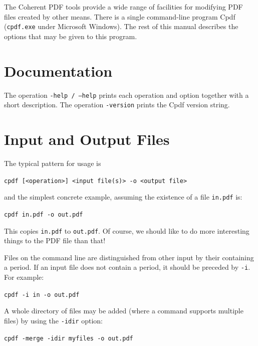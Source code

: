 \documentclass{book}
\begin{document}
  The Coherent PDF tools provide a wide range of facilities for modifying PDF
files created by other means. There is a single command-line program
Cpdf (\texttt{cpdf.exe} under Microsoft Windows). The rest of this manual describes the options that may be given
to this program.

\section{Documentation}

The operation \texttt{-help / --help} prints each operation and option together with a short description. The operation \texttt{-version} prints the Cpdf version string.

   
  \section{Input and Output Files}
  The typical pattern for usage is

  \begin{framed}
  \noindent\small\verb!cpdf [<operation>] <input file(s)> -o <output file>!
  \end{framed}

  \noindent and the simplest concrete example, assuming the existence of a file
\texttt{in.pdf} is:

  \begin{framed}
  \noindent\small\verb!cpdf in.pdf -o out.pdf!
  \end{framed}

  \noindent This copies \texttt{in.pdf} to \texttt{out.pdf}. Of course, we should like to do more interesting
things to the PDF file than that!

  Files on the command line are distinguished from other input by their
containing a period. If an input file does not contain a period, it should be
preceded by \verb!-i!. For example:

  \begin{framed}
  \noindent\small\verb!cpdf -i in -o out.pdf!
  \end{framed}

\noindent A whole directory of files may be added (where a command supports multiple files) by using the \verb!-idir! option:

  \begin{framed}
  \noindent\small\verb!cpdf -merge -idir myfiles -o out.pdf!
  \end{framed}
\end{document}

